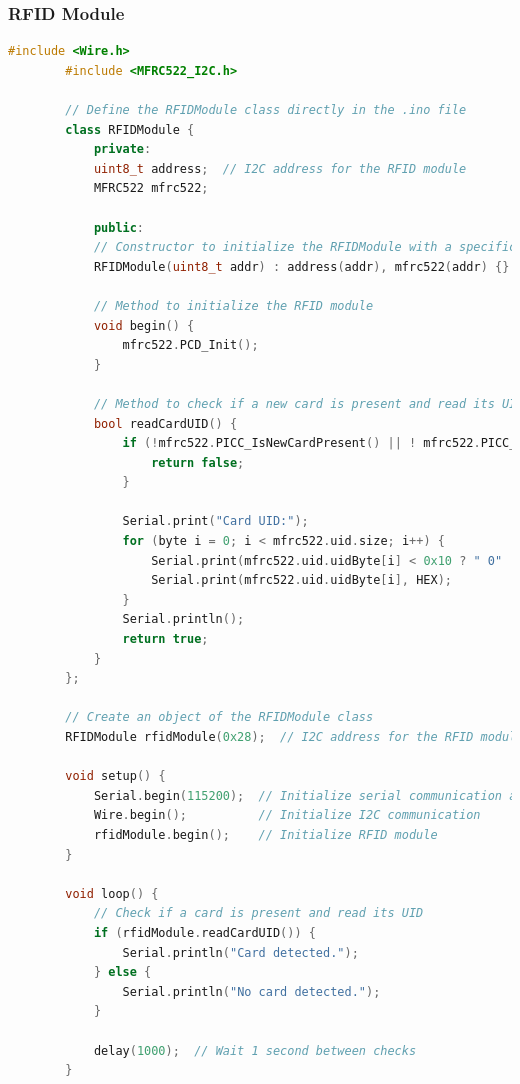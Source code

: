\documentclass[12pt,a4paper]{book}
\begin{document}
	\subsubsection*{RFID Module}
	\begin{lstlisting}[language=C++]
		#include <Wire.h>
		#include <MFRC522_I2C.h>
		
		// Define the RFIDModule class directly in the .ino file
		class RFIDModule {
			private:
			uint8_t address;  // I2C address for the RFID module
			MFRC522 mfrc522;
			
			public:
			// Constructor to initialize the RFIDModule with a specific I2C address
			RFIDModule(uint8_t addr) : address(addr), mfrc522(addr) {}
			
			// Method to initialize the RFID module
			void begin() {
				mfrc522.PCD_Init();
			}
			
			// Method to check if a new card is present and read its UID
			bool readCardUID() {
				if (!mfrc522.PICC_IsNewCardPresent() || ! mfrc522.PICC_ReadCardSerial()) {
					return false;
				}
				
				Serial.print("Card UID:");
				for (byte i = 0; i < mfrc522.uid.size; i++) {
					Serial.print(mfrc522.uid.uidByte[i] < 0x10 ? " 0" : " ");
					Serial.print(mfrc522.uid.uidByte[i], HEX);
				}
				Serial.println();
				return true;
			}
		};
		
		// Create an object of the RFIDModule class
		RFIDModule rfidModule(0x28);  // I2C address for the RFID module
		
		void setup() {
			Serial.begin(115200);  // Initialize serial communication at 115200 baud rate
			Wire.begin();          // Initialize I2C communication
			rfidModule.begin();    // Initialize RFID module
		}
		
		void loop() {
			// Check if a card is present and read its UID
			if (rfidModule.readCardUID()) {
				Serial.println("Card detected.");
			} else {
				Serial.println("No card detected.");
			}
			
			delay(1000);  // Wait 1 second between checks
		}
	\end{lstlisting}
	\clearpage
\end{document}

